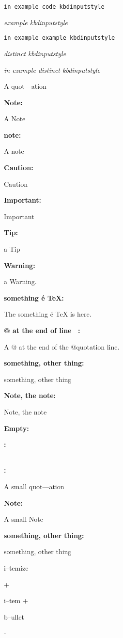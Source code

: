 \documentclass{book}
\begin{document}
\texttt{in example code kbdinputstyle}


{\ttfamily\textsl{example kbdinputstyle}}


\texttt{in example example kbdinputstyle}


{\ttfamily\textsl{distinct kbdinputstyle}}


{\ttfamily\textsl{in example distinct kbdinputstyle}}


A quot---ation


\textbf{Note:} 

A Note


\textbf{note:} 

A note


\textbf{Caution:} 

Caution


\textbf{Important:} 

Important


\textbf{Tip:} 

a Tip


\textbf{Warning:} 

a Warning.


\textbf{something \'{e} \TeX{}:} 

The something \'{e} \TeX{} is here.


\textbf{@ at the end of line \ {}:} 

A @ at the end of the @quotation line.


\textbf{something, other thing:} 

something, other thing


\textbf{Note, the note:} 

Note, the note


\textbf{Empty:} 

\textbf{:} 

\textbf{\leavevmode{}\\:} 

A small quot---ation


\textbf{Note:} 

A small Note


\textbf{something, other thing:} 

something, other thing


\textbullet{} 

i--temize


+ 

i--tem +


\textbullet{} 

b--ullet


- 
\end{document}

